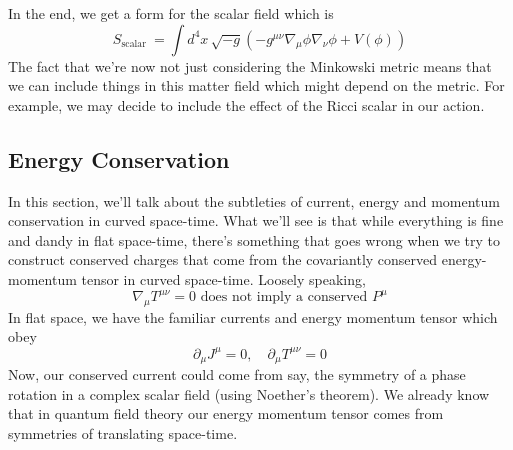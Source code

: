 In the end, we get a form for the scalar field which 
is 
\[
 S_{\text{scalar } }  = \int d ^4 x \, \sqrt{  - g }  
 \left(  - g^{ \mu \nu } \nabla _ \mu \phi \nabla _ \nu \phi  + V ( \phi )  \right) 
\]
The fact that we're now not just considering 
the Minkowski metric means that we can 
include things in this matter field which might  
depend on the metric. For example, we may decide 
to include the effect of the Ricci scalar in our action. 



\subsection{Energy Conservation} 
In this section, we'll talk about 
the subtleties of current, energy and 
momentum conservation in curved space-time. 
What we'll see is that while everything is fine 
and dandy in flat space-time, there's something 
that goes wrong when we try to construct conserved charges 
that come from the covariantly conserved energy-momentum 
tensor in curved space-time. Loosely speaking, 
\[
\nabla _ \mu T ^{ \mu \nu }  =0 \text{ does not imply a conserved }  P ^ \mu
\] 
In flat space, we have the familiar currents and 
energy momentum tensor which obey 
\[
\partial _ \mu J ^ \mu  =0 , \quad \partial  _ \mu T ^{ \mu \nu }  = 0
\] Now, our conserved current 
could come from say, the symmetry of a phase rotation 
in a complex scalar field (using Noether's theorem). 
We already know that in quantum field theory 
our energy momentum tensor comes from symmetries of 
translating space-time.

